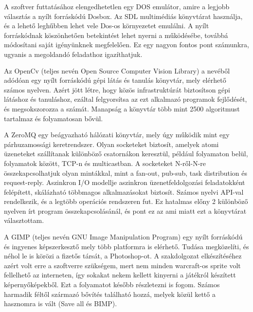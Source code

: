 

A szoftver futtatásához elengedhetetlen egy DOS emulátor, amire a legjobb választás a nyílt forráskódú Dosbox. Az SDL multimédiás könyvtárat használja, és a lehető leghűbben lehet vele Dos-os környezetet emulálni. A nyílt forráskódnak köszönhetően betekintést lehet nyerni a működésébe, továbbá módosítani saját igényünknek megfelelően. Ez egy nagyon fontos pont számunkra, ugyanis a megoldandó feladathoz igazíthatjuk.


Az OpenCv (teljes nevén Open Source Computer Vision Library) a nevéből adódóan egy nyílt forráskódú gépi látás és tanulás könyvtár, mely elérhető számos nyelven. Azért jött létre, hogy közös infrastruktúrát biztosítson gépi látáshoz és tanuláshoz, ezáltal felgyorsítsa az ezt alkalmazó programok fejlődését, és megsokszorozza a számát. Manapság a könyvtár több mint 2500 algoritmust tartalmaz és folyamatosan bővül.


A ZeroMQ egy beágyazható hálózati könyvtár, mely úgy működik mint egy párhuzamossági keretrendszer. Olyan socketeket biztosít, amelyek atomi üzeneteket szállítanak különböző csatornákon keresztül, például folyamaton belül, folyamatok között, TCP-n és multicastban. A socketeket N-ről-N-re összekapcsolhatjuk olyan mintákkal, mint a fan-out, pub-sub, task distribution és request-reply. Aszinkron I/O modellje aszinkron üzenetfeldolgozási feladatokként felépített, skálázható többmagos alkalmazásokat biztosít. Számos nyelvi API-val rendelkezik, és a legtöbb operációs rendszeren fut. Ez hatalmas előny 2 különböző nyelven írt program összekapcsolásánál, és pont ez az ami miatt ezt a könyvtárat választottam.


A GIMP (teljes nevén GNU Image Manipulation Program) egy nyílt forráskódú és ingyenes képszerkesztő mely több platformra is elérhető. Tudása megközelíti, és néhol le is körözi a fizetős társát, a Photoshop-ot. A szakdolgozat elkészítéséhez azért volt erre a szoftverre szükségem, mert nem minden warcraft-os sprite volt fellelhető az interneten, így sokakat nekem kellett kinyerni a játékról készített képernyőképekből. Ezt a folyamatot később részletezni is fogom. Számos harmadik féltől származó bővítés található hozzá, melyek közül kettő a hasznomra is vált (Save all és BIMP).


